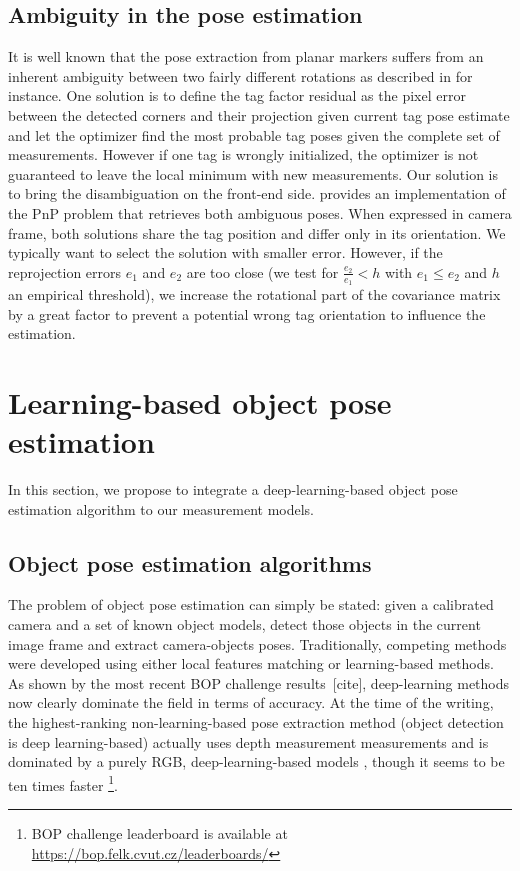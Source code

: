 \subsection{Ambiguity in the pose estimation}
It is well known that the pose extraction from planar markers suffers from an inherent ambiguity between two fairly different rotations as described in 
\cite{8206468} for instance. One solution is to define the tag factor residual as the pixel error between the detected corners and their projection given 
current tag pose estimate and let the optimizer find the most probable tag poses given the complete set of measurements. However if one tag is wrongly initialized, 
the optimizer is not guaranteed to leave the local minimum with new measurements. Our solution is to bring the disambiguation on the front-end side.
\cite{collins2014infinitesimal} provides an implementation of the PnP problem that retrieves both ambiguous poses. When expressed in camera frame, 
both solutions share the tag position and differ only in its orientation. We typically want to select the solution with smaller error. 
However, if the reprojection errors $e_1$ and $e_2$ are too close (we test for $\tfrac{e_2}{e_1} < h$ with $e_1 \leq e_2$ and $h$ an empirical threshold), 
we increase the rotational part of the covariance matrix by a great factor to prevent a potential wrong tag orientation to influence the estimation.


%
\section{Learning-based object pose estimation}
In this section, we propose to integrate a deep-learning-based object pose estimation algorithm \cite{labbe2020cosypose} to our measurement models. 


\subsection{Object pose estimation algorithms}
The problem of object pose estimation can simply be stated: given a calibrated camera and a set of known object models, detect those objects in the current image 
frame and extract camera-objects poses. Traditionally, competing methods were developed using either local features matching or learning-based methods.
As shown by the most recent BOP challenge results [cite], deep-learning methods now clearly dominate the field in terms of accuracy. 
At the time of the writing, the highest-ranking non-learning-based pose extraction method \cite{konig2020hybrid} (object detection is deep learning-based) 
actually uses depth measurement measurements and is dominated by a purely RGB, deep-learning-based models \cite{haugaard2021surfemb}, though it seems to be ten 
times faster \footnote{BOP challenge leaderboard is available at \url{https://bop.felk.cvut.cz/leaderboards/}}.

